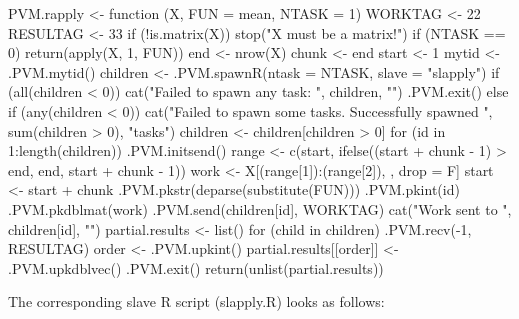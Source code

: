 \begin{Example}
\begin{Scode}

PVM.rapply <- function (X, FUN = mean, NTASK = 1)
{
    WORKTAG <- 22
    RESULTAG <- 33
    if (!is.matrix(X)) {
        stop("X must be a matrix!")
    }
    if (NTASK == 0) {
        return(apply(X, 1, FUN))
    }
    end <- nrow(X)
    chunk <- end%
    start <- 1
    mytid <- .PVM.mytid()
    children <- .PVM.spawnR(ntask = NTASK, slave = "slapply")
    if (all(children < 0)) {
        cat("Failed to spawn any task: ", children, "\n")
        .PVM.exit()
    }
    else if (any(children < 0)) {
        cat("Failed to spawn some tasks.  Successfully spawned ",
            sum(children > 0), "tasks\n")
        children <- children[children > 0]
    }
    for (id in 1:length(children)) {
        .PVM.initsend()
        range <- c(start, ifelse((start + chunk - 1) > end, end,
            start + chunk - 1))
        work <- X[(range[1]):(range[2]), , drop = F]
        start <- start + chunk
        .PVM.pkstr(deparse(substitute(FUN)))
        .PVM.pkint(id)
        .PVM.pkdblmat(work)
        .PVM.send(children[id], WORKTAG)
        cat("Work sent to ", children[id], "\n")
    }
    partial.results <- list()
    for (child in children) {
        .PVM.recv(-1, RESULTAG)
        order <- .PVM.upkint()
        partial.results[[order]] <- .PVM.upkdblvec()
    }
    .PVM.exit()
    return(unlist(partial.results))
}
\end{Scode} 
\label{ex:rpvm-rapplymaster}
\end{Example}

The corresponding slave R script (slapply.R) looks as follows:


